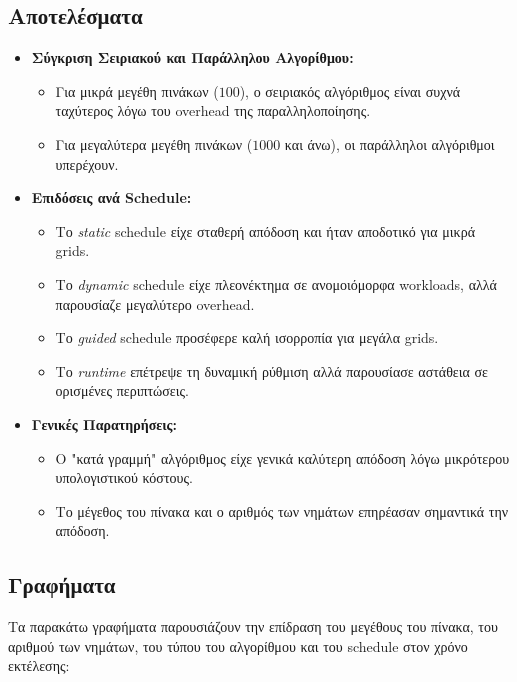 \documentclass{article}
\begin{document}
\subsection*{Αποτελέσματα} 
\begin{itemize} 
    \item \textbf{Σύγκριση Σειριακού και Παράλληλου Αλγορίθμου:} 
    \begin{itemize} 
        \item Για μικρά μεγέθη πινάκων ($100$), ο σειριακός αλγόριθμος είναι συχνά ταχύτερος λόγω του overhead της παραλληλοποίησης. 
        \item Για μεγαλύτερα μεγέθη πινάκων ($1000$ και άνω), οι παράλληλοι αλγόριθμοι υπερέχουν. 
    \end{itemize} 
    \item \textbf{Επιδόσεις ανά Schedule:} 
    \begin{itemize} 
        \item Το \textit{static} schedule είχε σταθερή απόδοση και ήταν αποδοτικό για μικρά grids. 
        \item Το \textit{dynamic} schedule είχε πλεονέκτημα σε ανομοιόμορφα workloads, αλλά παρουσίαζε μεγαλύτερο overhead. 
        \item Το \textit{guided} schedule προσέφερε καλή ισορροπία για μεγάλα grids. 
        \item Το \textit{runtime} επέτρεψε τη δυναμική ρύθμιση αλλά παρουσίασε αστάθεια σε ορισμένες περιπτώσεις. 
    \end{itemize} 
    \item \textbf{Γενικές Παρατηρήσεις:} 
    \begin{itemize} 
        \item Ο "κατά γραμμή" αλγόριθμος είχε γενικά καλύτερη απόδοση λόγω μικρότερου υπολογιστικού κόστους. 
        \item Το μέγεθος του πίνακα και ο αριθμός των νημάτων επηρέασαν σημαντικά την απόδοση. 
    \end{itemize} 
\end{itemize}
\subsection*{Γραφήματα} Τα παρακάτω γραφήματα παρουσιάζουν την επίδραση του μεγέθους του πίνακα, του αριθμού των νημάτων, του τύπου του αλγορίθμου και του schedule στον χρόνο εκτέλεσης:
\end{document}
